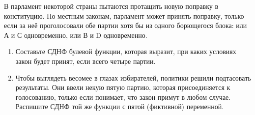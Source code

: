 \question
В парламент некоторой страны пытаются протащить новую поправку в конституцию. По местным законам, парламент может принять поправку, только если за неё проголосовали обе партии хотя бы из одного борющегося блока: или А и С одновременно, или В и D одновременно.

\begin{enumerate}
    \item Составьте СДНФ булевой функции, которая выразит, при каких условиях закон будет принят, если всего четыре партии.
    \item Чтобы выглядеть весомее в глазах избирателей, политики решили подтасовать результаты.  Они ввели некую пятую партию, которая присоединяется к голосованию, только если понимает, что закон примут в любом случае. Распишите СДНФ той же функции с пятой (фиктивной) переменной.
\end{enumerate}